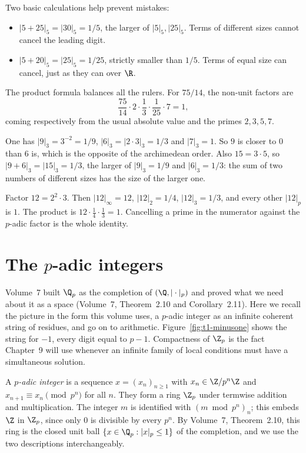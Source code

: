Two basic calculations help prevent mistakes:
\begin{itemize}
\item $|5+25|_5=|30|_5=1/5$, the larger of $|5|_5,|25|_5$.
Terms of different sizes cannot cancel the leading digit.
\item $|5+20|_5=|25|_5=1/25$, strictly smaller than $1/5$.
Terms of equal size can cancel, just as they can over $\R$.
\end{itemize}
The product formula balances all the rulers. For $75/14$, the non-unit
factors are
\[
\frac{75}{14}\cdot2\cdot\frac13\cdot\frac1{25}\cdot7=1,
\]
coming respectively from the usual absolute value and the primes $2,3,5,7$.

\begin{examplex}
One has $|9|_3=3^{-2}=1/9$, $|6|_3=|2\cdot 3|_3=1/3$ and $|7|_3=1$. So $9$ is closer to $0$ than $6$ is, which is the opposite of the archimedean order. Also $15=3\cdot5$, so $|9+6|_3=|15|_3=1/3$, the larger of $|9|_3=1/9$ and $|6|_3=1/3$: the sum of two numbers of different sizes has the size of the larger one.
\end{examplex}

\begin{examplex}
Factor $12=2^2\cdot 3$. Then $|12|_\infty=12$, $|12|_2=1/4$, $|12|_3=1/3$, and every other $|12|_p$ is $1$. The product is $12\cdot\frac14\cdot\frac13=1$. Cancelling a prime in the numerator against the $p$-adic factor is the whole identity.
\end{examplex}

\section{The \texorpdfstring{$p$}{p}-adic integers}

Volume~7 built $\Q_p$ as the completion of $(\Q,|\cdot|_p)$ and proved what we need about it as a space (Volume~7,
Theorem~2.10 and Corollary~2.11). Here we recall the picture in the form this volume uses, a $p$-adic integer as an infinite
coherent string of residues, and go on to arithmetic. Figure~\ref{fig:t1-minusone} shows the string for $-1$, every digit equal
to $p-1$. Compactness of $\Z_p$ is the fact Chapter~9 will use whenever an infinite family of local conditions must have a
simultaneous solution.

\begin{definition}
A \emph{$p$-adic integer} is a sequence $x=(x_n)_{n\ge1}$ with $x_n\in\Z/p^n\Z$ and $x_{n+1}\equiv x_n\pmod{p^n}$ for all $n$.
They form a ring $\Z_p$ under termwise addition and multiplication. The integer $m$ is identified with $(m\bmod p^n)_n$; this
embeds $\Z$ in $\Z_p$, since only $0$ is divisible by every $p^n$. By Volume~7, Theorem~2.10, this ring is the closed unit
ball $\{x\in\Q_p:|x|_p\le1\}$ of the completion, and we use the two descriptions interchangeably.
\end{definition}

